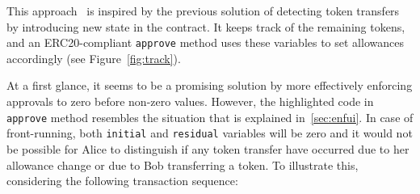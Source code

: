This approach~\cite{Ref18} is inspired by the previous solution of detecting token transfers by introducing new state in the contract. It keeps track of the remaining tokens, and an ERC20-compliant \texttt{approve} method uses these variables to set allowances accordingly (see Figure~\ref{fig:track}).

%
%
%	
%	
%	
%	
%
%
%	
%	
%	
%	

At a first glance, it seems to be a promising solution by more effectively enforcing approvals to zero before non-zero values. However, the highlighted code in \texttt{approve} method resembles the situation that is explained in~\ref{sec:enfui}. In case of front-running, both \texttt{initial} and \texttt{residual} variables will be zero and it would not be possible for Alice to distinguish if any token transfer have occurred due to her allowance change or due to Bob transferring a token. To illustrate this, considering the following transaction sequence:

